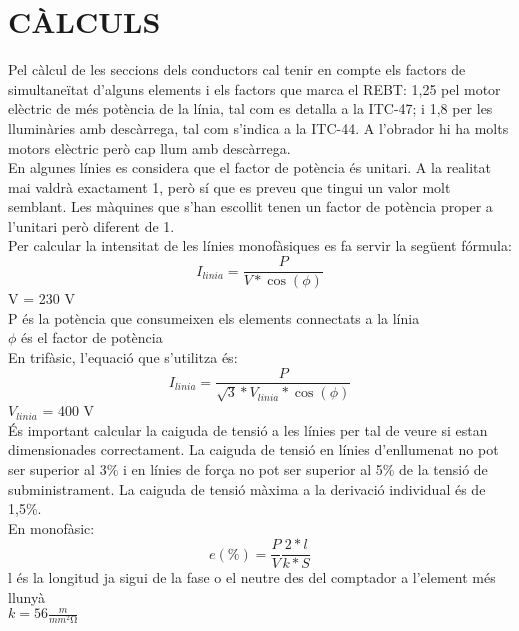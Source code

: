 \chapter{\uppercase{Càlculs}}
Pel càlcul de les seccions dels conductors cal tenir en compte els factors de simultaneïtat d'alguns elements i els factors que marca el REBT: 1,25 pel motor elèctric de més potència de la línia, tal com es detalla a la ITC-47; i 1,8 per les lluminàries amb descàrrega, tal com s'indica a la ITC-44. A l'obrador hi ha molts motors elèctric però cap llum amb descàrrega.\\
\newline
En algunes línies es considera que el factor de potència és unitari. A la realitat mai valdrà exactament 1, però sí que es preveu que tingui un valor molt semblant. Les màquines que s'han escollit tenen un factor de potència proper a l'unitari però diferent de 1.\\
\newline Per calcular la intensitat de les línies monofàsiques es fa servir la següent fórmula:
\begin{equation}
I_{linia} = \frac{P}{V*\cos(\phi)}
\end{equation}
V = 230 V\\
P és la potència que consumeixen els elements connectats a la línia\\
$\phi$ és el factor de potència\\
\newline En trifàsic, l'equació que s'utilitza és:
\begin{equation}
I_{linia} = \frac{P}{\sqrt3*V_{linia}*\cos(\phi)}
\end{equation}
$V_{linia}$ = 400 V\\
\newline És important calcular la caiguda de tensió a les línies per tal de veure si estan dimensionades correctament. La caiguda de tensió en línies d'enllumenat no pot ser superior al 3\% i en línies de força no pot ser superior al 5\% de la tensió de subministrament. La caiguda de tensió màxima a la derivació individual és de 1,5\%.\\
\newline En monofàsic:
\begin{equation}
e(\%)=\frac{P}{V}\frac{2*l}{k*S}
\end{equation}
l és la longitud ja sigui de la fase o el neutre des del comptador a l'element més llunyà\\
$k = 56 \frac{m}{mm^{2}\si{\ohm}}$\\
